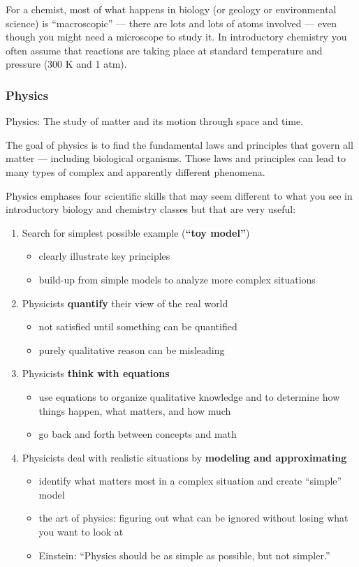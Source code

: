For a chemist, most of what happens in biology (or geology or environmental science) is ``macroscopic'' --- there are lots and lots of atoms involved --- even though you might need a microscope to study it. In introductory chemistry you often assume that reactions are taking place at standard temperature and pressure (300 K and 1 atm).

\subsubsection{Physics}
Physics: The study of matter and its motion through space and time.

The goal of physics is to find the fundamental laws and principles that govern all matter --- including biological organisms. Those laws and principles can lead to many types of complex and apparently different phenomena.

Physics emphases four scientific skills that may seem different to what you see in introductory biology and chemistry classes but that are very useful:

\begin{enumerate}
\item Search for simplest possible example ({\bf ``toy model''})
  \begin{itemize}
    \item clearly illustrate key principles
    \item build-up from simple models to analyze more complex situations
  \end{itemize}
  
\item Physicists {\bf quantify} their view of the real world
  \begin{itemize}
    \item not satisfied until something can be quantified
    \item purely qualitative reason can be misleading
  \end{itemize}

\item Physicists {\bf think with equations}
  \begin{itemize}
    \item use equations to organize qualitative knowledge and to determine how things happen, what matters, and how much
    \item go back and forth between concepts and math
  \end{itemize}
  
\item Physicists deal with realistic situations by {\bf modeling and approximating}
  \begin{itemize}
    \item identify what matters most in a complex situation and create ``simple'' model
    \item the art of physics: figuring out what can be ignored without losing what you want to look at
    \item Einstein: ``Physics should be as simple as possible, but not simpler.''
  \end{itemize}

\end{enumerate}  

